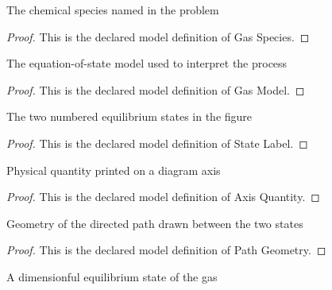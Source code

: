 \begin{definition}
  \label{def:physics:phyx-mini-0373:phyxminiproblems-problemphyxmini0373-gasspecies}
  The chemical species named in the problem
\end{definition}
\begin{proof}
  This is the declared model definition of Gas Species.
\end{proof}
\begin{definition}
  \label{def:physics:phyx-mini-0373:phyxminiproblems-problemphyxmini0373-gasmodel}
  The equation-of-state model used to interpret the process
\end{definition}
\begin{proof}
  This is the declared model definition of Gas Model.
\end{proof}
\begin{definition}
  \label{def:physics:phyx-mini-0373:phyxminiproblems-problemphyxmini0373-statelabel}
  The two numbered equilibrium states in the figure
\end{definition}
\begin{proof}
  This is the declared model definition of State Label.
\end{proof}
\begin{definition}
  \label{def:physics:phyx-mini-0373:phyxminiproblems-problemphyxmini0373-axisquantity}
  Physical quantity printed on a diagram axis
\end{definition}
\begin{proof}
  This is the declared model definition of Axis Quantity.
\end{proof}
\begin{definition}
  \label{def:physics:phyx-mini-0373:phyxminiproblems-problemphyxmini0373-pathgeometry}
  Geometry of the directed path drawn between the two states
\end{definition}
\begin{proof}
  This is the declared model definition of Path Geometry.
\end{proof}
\begin{definition}
  \label{def:physics:phyx-mini-0373:phyxminiproblems-problemphyxmini0373-thermodynamicstate}
  A dimensionful equilibrium state of the gas
\end{definition}
